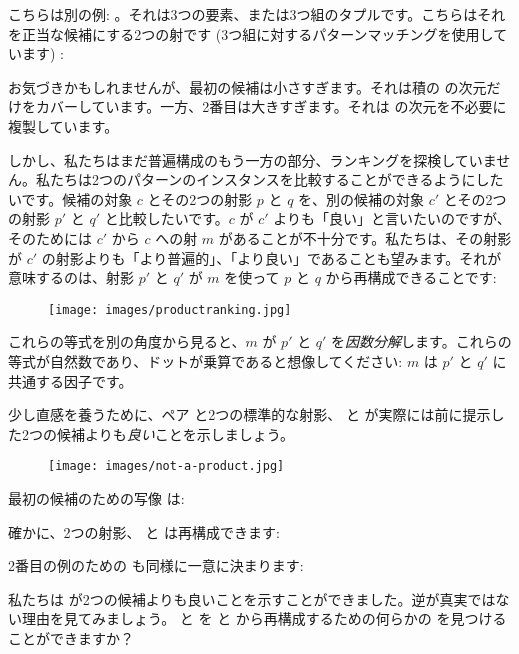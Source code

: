 こちらは別の例: 。それは3つの要素、または3つ組のタプルです。こちらはそれを正当な候補にする2つの射です (3つ組に対するパターンマッチングを使用しています) : 

お気づきかもしれませんが、最初の候補は小さすぎます。それは積の  の次元だけをカバーしています。一方、2番目は大きすぎます。それは  の次元を不必要に複製しています。

しかし、私たちはまだ普遍構成のもう一方の部分、ランキングを探検していません。私たちは2つのパターンのインスタンスを比較することができるようにしたいです。候補の対象 $c$ とその2つの射影 $p$ と $q$ を、別の候補の対象 $c'$ とその2つの射影 $p'$ と $q'$ と比較したいです。$c$ が $c'$ よりも「良い」と言いたいのですが、そのためには $c'$ から $c$ への射 $m$ があることが不十分です。私たちは、その射影が $c'$ の射影よりも「より普遍的」、「より良い」であることも望みます。それが意味するのは、射影 $p'$ と $q'$ が $m$ を使って $p$ と $q$ から再構成できることです: 


\begin{figure}[H]
  \centering
  \texttt{[image: images/productranking.jpg]}
\end{figure}

\noindent
これらの等式を別の角度から見ると、$m$ が $p'$ と $q'$ を\emph{因数分解}します。これらの等式が自然数であり、ドットが乗算であると想像してください: $m$ は $p'$ と $q'$ に共通する因子です。

少し直感を養うために、ペア  と2つの標準的な射影、 と  が実際には前に提示した2つの候補よりも\emph{良い}ことを示しましょう。

\begin{figure}[H]
  \centering
  \texttt{[image: images/not-a-product.jpg]}
\end{figure}

\noindent
最初の候補のための写像  は: 

確かに、2つの射影、 と  は再構成できます:

2番目の例のための  も同様に一意に決まります: 

私たちは  が2つの候補よりも良いことを示すことができました。逆が真実ではない理由を見てみましょう。  と  を  と から再構成するための何らかの  を見つけることができますか？

